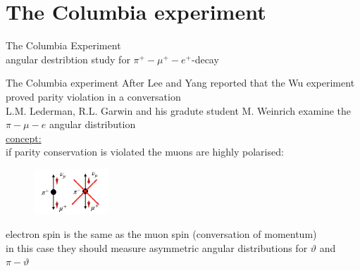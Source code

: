 \documentclass[aspectratio=1610, 10pt]{beamer}
\begin{document}
\section{The Columbia experiment}

\begin{frame}
	\begin{center}
		\begin{Large}
			The Columbia Experiment\\
			angular destribtion study for $\pi^{+}-\mu^{+}-e^{+}$-decay
		\end{Large}
	\end{center}
\end{frame}

\begin{frame}{The Columbia experiment}
	After Lee and Yang reported that the Wu experiment proved parity violation in a conversation\\
	L.M. Lederman, R.L. Garwin and his gradute student M. Weinrich examine the $\pi-\mu-e$ angular distribution \cite{PhysRev.105.1415}\\
	\vspace{0.2cm}
	\underline{concept:}\\
	if parity conservation is violated the muons are highly polarised:
	\begin{figure}
		\includegraphics[width=0.25\textwidth]{images/muon_polarization.png}
	\end{figure}
	\vspace{0.2cm}
	electron spin is the same as the muon spin (conversation of momentum)\\
	in this case they should measure asymmetric angular distributions for $\vartheta$ and $\pi - \vartheta$\\
\end{frame}
\end{document}
